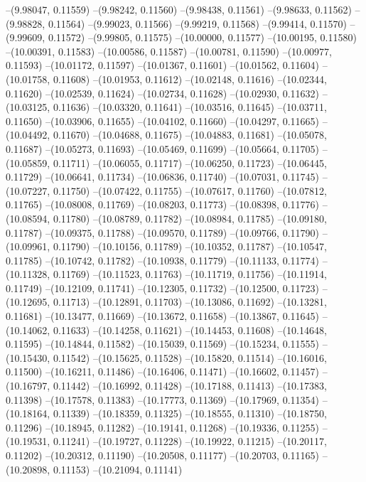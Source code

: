 --(9.98047, 0.11559)
--(9.98242, 0.11560)
--(9.98438, 0.11561)
--(9.98633, 0.11562)
--(9.98828, 0.11564)
--(9.99023, 0.11566)
--(9.99219, 0.11568)
--(9.99414, 0.11570)
--(9.99609, 0.11572)
--(9.99805, 0.11575)
--(10.00000, 0.11577)
--(10.00195, 0.11580)
--(10.00391, 0.11583)
--(10.00586, 0.11587)
--(10.00781, 0.11590)
--(10.00977, 0.11593)
--(10.01172, 0.11597)
--(10.01367, 0.11601)
--(10.01562, 0.11604)
--(10.01758, 0.11608)
--(10.01953, 0.11612)
--(10.02148, 0.11616)
--(10.02344, 0.11620)
--(10.02539, 0.11624)
--(10.02734, 0.11628)
--(10.02930, 0.11632)
--(10.03125, 0.11636)
--(10.03320, 0.11641)
--(10.03516, 0.11645)
--(10.03711, 0.11650)
--(10.03906, 0.11655)
--(10.04102, 0.11660)
--(10.04297, 0.11665)
--(10.04492, 0.11670)
--(10.04688, 0.11675)
--(10.04883, 0.11681)
--(10.05078, 0.11687)
--(10.05273, 0.11693)
--(10.05469, 0.11699)
--(10.05664, 0.11705)
--(10.05859, 0.11711)
--(10.06055, 0.11717)
--(10.06250, 0.11723)
--(10.06445, 0.11729)
--(10.06641, 0.11734)
--(10.06836, 0.11740)
--(10.07031, 0.11745)
--(10.07227, 0.11750)
--(10.07422, 0.11755)
--(10.07617, 0.11760)
--(10.07812, 0.11765)
--(10.08008, 0.11769)
--(10.08203, 0.11773)
--(10.08398, 0.11776)
--(10.08594, 0.11780)
--(10.08789, 0.11782)
--(10.08984, 0.11785)
--(10.09180, 0.11787)
--(10.09375, 0.11788)
--(10.09570, 0.11789)
--(10.09766, 0.11790)
--(10.09961, 0.11790)
--(10.10156, 0.11789)
--(10.10352, 0.11787)
--(10.10547, 0.11785)
--(10.10742, 0.11782)
--(10.10938, 0.11779)
--(10.11133, 0.11774)
--(10.11328, 0.11769)
--(10.11523, 0.11763)
--(10.11719, 0.11756)
--(10.11914, 0.11749)
--(10.12109, 0.11741)
--(10.12305, 0.11732)
--(10.12500, 0.11723)
--(10.12695, 0.11713)
--(10.12891, 0.11703)
--(10.13086, 0.11692)
--(10.13281, 0.11681)
--(10.13477, 0.11669)
--(10.13672, 0.11658)
--(10.13867, 0.11645)
--(10.14062, 0.11633)
--(10.14258, 0.11621)
--(10.14453, 0.11608)
--(10.14648, 0.11595)
--(10.14844, 0.11582)
--(10.15039, 0.11569)
--(10.15234, 0.11555)
--(10.15430, 0.11542)
--(10.15625, 0.11528)
--(10.15820, 0.11514)
--(10.16016, 0.11500)
--(10.16211, 0.11486)
--(10.16406, 0.11471)
--(10.16602, 0.11457)
--(10.16797, 0.11442)
--(10.16992, 0.11428)
--(10.17188, 0.11413)
--(10.17383, 0.11398)
--(10.17578, 0.11383)
--(10.17773, 0.11369)
--(10.17969, 0.11354)
--(10.18164, 0.11339)
--(10.18359, 0.11325)
--(10.18555, 0.11310)
--(10.18750, 0.11296)
--(10.18945, 0.11282)
--(10.19141, 0.11268)
--(10.19336, 0.11255)
--(10.19531, 0.11241)
--(10.19727, 0.11228)
--(10.19922, 0.11215)
--(10.20117, 0.11202)
--(10.20312, 0.11190)
--(10.20508, 0.11177)
--(10.20703, 0.11165)
--(10.20898, 0.11153)
--(10.21094, 0.11141)
